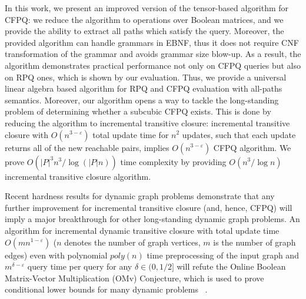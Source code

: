 
In this work, we present an improved version of the tensor-based algorithm for CFPQ: we reduce the algorithm to operations over Boolean matrices, and we provide the ability to extract all paths which satisfy the query.
Moreover, the provided algorithm can handle grammars in EBNF, thus it does not require CNF transformation of the grammar and avoids grammar size blow-up.
As a result, the algorithm demonstrates practical performance not only on CFPQ queries but also on RPQ ones, which is shown by our evaluation.
Thus, we provide a universal linear algebra based algorithm for RPQ and CFPQ evaluation with all-paths semantics.
Moreover, our algorithm opens a way to tackle the long-standing problem of determining whether a subcubic CFPQ exists.
This is done by reducing the algorithm to incremental transitive closure: incremental transitive closure with $O(n^{3-\varepsilon})$ total update time for $n^2$ updates, such that each update returns all of the new reachable pairs, implies $O(n^{3-\varepsilon})$ CFPQ algorithm.
We prove $O({|P|}^3n^3/\log (|P|n))$ time complexity by providing $O(n^3/\log{n})$ incremental transitive closure algorithm.


Recent hardness results for dynamic graph problems demonstrate that any further improvement for incremental transitive closure (and, hence, CFPQ) will imply a major breakthrough for other long-standing dynamic graph problems. An algorithm for incremental dynamic transitive closure with total update time $O(mn^{1-\varepsilon})$ ($n$ denotes the number of graph vertices, $m$ is the number of graph edges) even with polynomial $poly(n)$ time preprocessing of the input graph and $m^{\delta - \varepsilon}$ query time per query for any $\delta \in (0, 1/2]$ will refute the Online Boolean Matrix-Vector Multiplication (OMv) Conjecture, which is used to prove conditional lower bounds for many dynamic problems ~\cite{8948597, 10.1145/2746539.2746609}.



